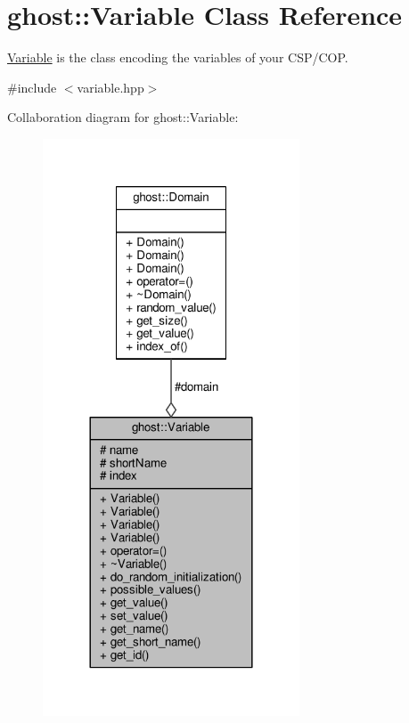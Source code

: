 \hypertarget{classghost_1_1Variable}{\section{ghost\-:\-:Variable Class Reference}
\label{classghost_1_1Variable}
}


\hyperlink{classghost_1_1Variable}{Variable} is the class encoding the variables of your C\-S\-P/\-C\-O\-P.  




{\ttfamily \#include $<$variable.\-hpp$>$}



Collaboration diagram for ghost\-:\-:Variable\-:\nopagebreak
\begin{figure}[H]
\begin{center}
\leavevmode
\includegraphics[width=216pt]{classghost_1_1Variable__coll__graph}
\end{center}
\end{figure}
